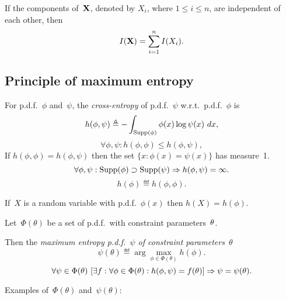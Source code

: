 \documentclass[10pt,a4paper]{article}
\theoremstyle{plain} \newtheorem{Lem}{Lemma}
\begin{document}
If the components of~$\mathbf X$, denoted by $X_i$, where $1 \le i \le n$, are independent of each other,
then
$$ I(\mathbf X) = \sum_{i=1}^n I(X_i). $$


\subsection{Principle of maximum entropy}
For p.d.f.~$\phi$ and~$\psi$,
the {\em cross-entropy} of p.d.f.~$\psi$ w.r.t.~p.d.f.~$\phi$ is
$$ h(\phi,\psi) \triangleq - \int_{\mathrm {Supp}(\phi)} \phi(x) \log \psi(x) \ dx, $$
\begin{equation} \label{min_entropy}
 \forall \phi, \psi : h(\phi, \phi) \le h(\phi,\psi),  
\end{equation}
If $h(\phi, \phi) = h(\phi,\psi)$
then the set $\{x: \phi(x)= \psi(x)\}$ has measure~1.
$$ \forall \phi, \psi : \mathrm {Supp}(\phi) \supset \mathrm {Supp}(\psi) \Rightarrow h(\phi,\psi) = \infty. $$
$$ h (\phi) \eqdef h(\phi,\phi). $$

If~$X$ is a random variable with p.d.f.~$\phi(x)$ then $h(X) = h(\phi)$.

Let~$\Phi(\theta)$ be a set of p.d.f.~with constraint parameters~$\mathbf \theta$.

Then the {\em maximum entropy p.d.f.~$\psi$ of constraint parameters~$\theta$}
$$ \psi(\theta) \eqdef \arg \max_{\phi \in \Phi(\theta)} h(\phi). $$ 
$$ \forall \psi \in \Phi(\theta) \
  [\exists f : \forall \phi \in \Phi(\theta): h(\phi,\psi) = f(\mathbf \theta)] \Rightarrow \psi = \psi(\theta).
$$


Examples of~$\Phi(\theta)$ and~$\psi(\theta)$:
\end{document}
